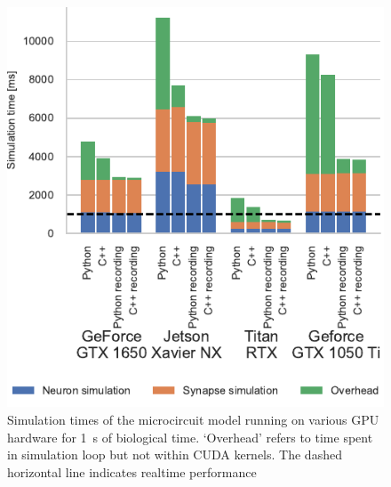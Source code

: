 \documentclass[utf8]{frontiersSCNS} %
\begin{document}
\begin{figure}[t!]
    \begin{center}
        \includegraphics{figures/microcircuit_overheads.pdf}
    \end{center}
    \caption{Simulation times of the microcircuit model running on various GPU hardware for \SI{1}{\second} of biological time.
    `Overhead' refers to time spent in simulation loop but not within CUDA kernels.
    The dashed horizontal line indicates realtime performance}
    \label{fig:microcircuit_overheads}
\end{figure}
%
\end{document}
